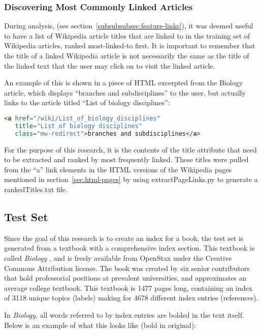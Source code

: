 \subsubsection{Discovering Most Commonly Linked Articles}
\label{sec:ranked-titles}

During analysis, (see section~\ref{subsubsubsec:feature-links}), it was deemed useful to have a list of Wikipedia article titles that are linked to in the training set of Wikipedia articles, ranked most-linked-to first.
It is important to remember that the title of a linked Wikipedia article is not necessarily the same as the title of the linked text that the user may click on to visit the linked article.

An example of this is shown in a piece of HTML excerpted from the Biology article, which displays ``branches and subdisciplines'' to the user, but actually links to the article titled ``List of biology disciplines'':
\begin{lstlisting}[language=HTML]
<a href="/wiki/List_of_biology_disciplines"
   title="List of biology disciplines"
   class="mw-redirect">branches and subdisciplines</a>
\end{lstlisting}
\noindent For the purpose of this research, it is the contents of the title attribute that need to be extracted and ranked by most frequently linked.
These titles were pulled from the ``a'' link elements in the HTML versions of the Wikipedia pages mentioned in section~\ref{sec:html-pages} by using extractPageLinks.py to generate a rankedTitles.txt file.

\subsection{Test Set}
\label{subsec:test-set}

Since the goal of this research is to create an index for a book, the test set is generated from a textbook with a comprehensive index section.
This textbook is called {\it Biology} \cite{biology}, and is freely available from OpenStax \cite{openstax-bio} under the Creative Commons Attribution license.
The book was created by six senior contributors that hold professorial positions at prevalent universities, and approximates an average college textbook.
This textbook is 1477 pages long, containing an index of 3118 unique topics (labels) making for 4678 different index entries (references).

In {\it Biology}, all words referred to by index entries are bolded in the text itself. Below is an example of what this looks like (bold in original):

